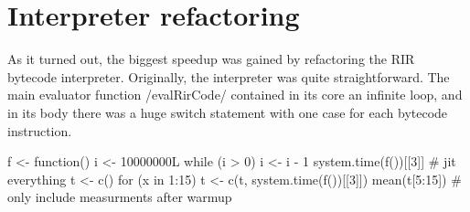 
\section{Interpreter refactoring}

As it turned out, the biggest speedup was gained by refactoring the RIR bytecode interpreter. Originally, the interpreter was quite straightforward. The main evaluator function \cinline/evalRirCode/ contained in its core an infinite loop, and in its body there was a huge switch statement with one case for each bytecode instruction. 

\begin{listing}[htbp]
  \caption{\label{lst:}}
  \begin{rcode}

  \end{rcode}
\end{listing}





\begin{listing}[htbp]
  \begin{rcode}
f <- function() {
    i <- 10000000L
    while (i > 0) {
        i <- i - 1
    }
}
system.time(f())[[3]]  # jit everything
t <- c()
for (x in 1:15) t <- c(t, system.time(f())[[3]])
mean(t[5:15])  # only include measurments after warmup
  \end{rcode}
\end{listing}
